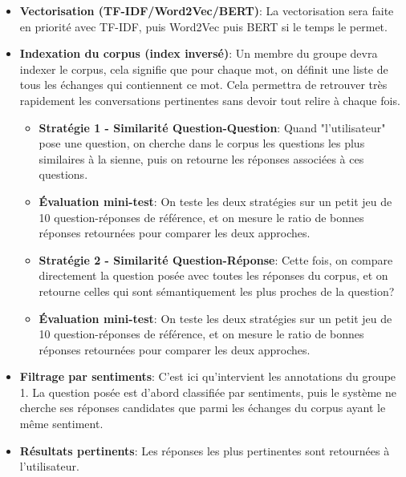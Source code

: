 \documentclass[12pt,a4paper]{article}
\begin{document}
\begin{itemize}
  \item \textbf{Vectorisation (TF-IDF/Word2Vec/BERT)}: La vectorisation sera faite en priorité avec TF-IDF, puis Word2Vec puis BERT si le temps le permet.
  \item \textbf{Indexation du corpus (index inversé)}: Un membre du groupe devra indexer le corpus, cela signifie que pour chaque mot, on définit une liste de tous les échanges qui contiennent ce mot. Cela permettra de retrouver très rapidement les conversations pertinentes sans devoir tout relire à chaque fois.
  \begin{itemize}
    \item \textbf{Stratégie 1 - Similarité Question-Question}: Quand "l'utilisateur" pose une question, on cherche dans le corpus les questions les plus similaires à la sienne, puis on retourne les réponses associées à ces questions.
    \item \textbf{Évaluation mini-test}: On teste les deux stratégies sur un petit jeu de 10 question-réponses de référence, et on mesure le ratio de bonnes réponses retournées pour comparer les deux approches.
  \end{itemize}
  \begin{itemize}
    \item \textbf{Stratégie 2 - Similarité Question-Réponse}: Cette fois, on compare directement la question posée avec toutes les réponses du corpus, et on retourne celles qui sont sémantiquement les plus proches de la question?
    \item \textbf{Évaluation mini-test}: On teste les deux stratégies sur un petit jeu de 10 question-réponses de référence, et on mesure le ratio de bonnes réponses retournées pour comparer les deux approches.
  \end{itemize}
  \item \textbf{Filtrage par sentiments}: C'est ici qu'intervient les annotations du groupe 1. La question posée est d'abord classifiée par sentiments, puis le système ne cherche ses réponses candidates que parmi les échanges du corpus ayant le même sentiment.
  \item \textbf{Résultats pertinents}: Les réponses les plus pertinentes sont retournées à l'utilisateur.
\end{itemize}
\end{document}
